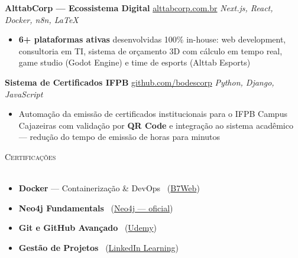 \documentclass[a4paper]{article}
\newcommand{\lineunder}{
    \vspace*{-8pt} \\
    \hspace*{-18pt} \hrulefill \\
}
\newcommand{\header}[1]{
    {\hspace*{-18pt}\vspace*{6pt} \textsc{#1}}
    \vspace*{-6pt} \lineunder
}
\begin{document}
\textbf{AlttabCorp — Ecossistema Digital}
\hfill {\small \href{https://alttabcorp.com.br}{alttabcorp.com.br}}
\hfill {\sl Next.js, React, Docker, n8n, LaTeX}\\
\vspace{-3mm}
\begin{itemize}[leftmargin=*, itemsep=-2pt]
    \item \textbf{6+ plataformas ativas} desenvolvidas 100\% in-house: web development, consultoria em TI, sistema de orçamento 3D com cálculo em tempo real, game studio (Godot Engine) e time de esports (Alttab Esports)
\end{itemize}
\vspace{2mm}

\textbf{Sistema de Certificados IFPB}
\hfill {\small \href{https://github.com/bodescorp/Cext-final-}{github.com/bodescorp}}
\hfill {\sl Python, Django, JavaScript}\\
\vspace{-3mm}
\begin{itemize}[leftmargin=*, itemsep=-2pt]
    \item Automação da emissão de certificados institucionais para o IFPB Campus Cajazeiras com validação por \textbf{QR Code} e integração ao sistema acadêmico — redução do tempo de emissão de horas para minutos
\end{itemize}

\vspace{3mm}

\header{Certificações}
\vspace{2mm}
\begin{itemize}[leftmargin=*, itemsep=-2pt]
    \item \textbf{Docker} — Containerização \& DevOps \ (\href{https://drive.google.com/drive/folders/1YKThgvnT5h1bA_Hb0uDiIf7p8Qiph-NC}{B7Web})
    \item \textbf{Neo4j Fundamentals} \ (\href{https://graphacademy.neo4j.com/c/9d25b259-5995-4053-8475-7b2bf61f163e/}{Neo4j — oficial})
    \item \textbf{Git e GitHub Avançado} \ (\href{https://www.udemy.com/certificate/UC-db57cce7-1471-47ff-9828-0e3a4d7da628/}{Udemy})
    \item \textbf{Gestão de Projetos} \ (\href{https://www.linkedin.com/learning/certificates/0fc1a744c87dc72f53e8c694fd58809808a183327167377cb224c1ac43e732b6}{LinkedIn Learning})
\end{itemize}

\vspace{3mm}
\end{document}
